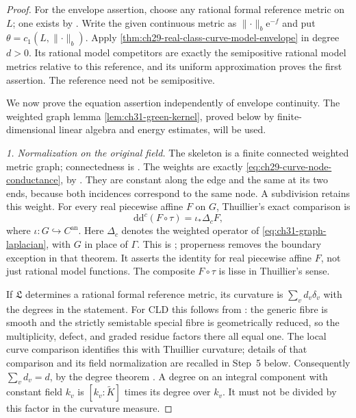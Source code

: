 \begin{proof}
For the envelope assertion, choose any rational formal reference
metric on \(L\); one exists by \cite[\S2.1 and Proposition~2.10]{GM19}.
Write the given continuous metric as
\(\lVert\cdot\rVert_b\mathrm e^{-f}\) and put
\(\theta=c_1(L,\lVert\cdot\rVert_b)\).
Apply \cref{thm:ch29-real-class-curve-model-envelope} in degree \(d>0\).
Its rational model competitors are exactly the semipositive rational
model metrics relative to this reference, and its uniform approximation
proves the first assertion.  The reference need not be semipositive.

We now prove the equation assertion independently of envelope continuity.
The weighted graph lemma \cref{lem:ch31-green-kernel}, proved below by
finite-dimensional linear algebra and energy estimates, will be used.

\emph{1. Normalization on the original field.}
The skeleton is a finite connected weighted metric graph; connectedness
is \cite[Remark~2.2.19(3)]{Thu05}.  The weights are exactly
\eqref{eq:ch29-curve-node-conductance}, by
\cite[\S2.2.3, p.~41]{Thu05}.  They are constant along the edge and
the same at its two ends, because both incidences correspond to the
same node.  A subdivision retains this weight.  For every real
piecewise affine \(F\) on \(G\), Thuillier's exact comparison is
\begin{equation}
\label{eq:ch29-curve-retraction-current}
  \mathrm d\mathrm d^c(F\circ\tau)=\iota_*\Delta_c F,
\end{equation}
where \(\iota:G\hookrightarrow C^{\mathrm{an}}\).
Here \(\Delta_c\) denotes the weighted operator of
\eqref{eq:ch31-graph-laplacian}, with \(G\) in place of \(\Gamma\).
This is \cite[Theorem~3.2.10(ii)]{Thu05}; properness removes the
boundary exception in that theorem.  It asserts the identity for real
piecewise affine \(F\), not just rational model functions.  The
composite \(F\circ\tau\) is lisse in Thuillier's sense.

If \(\mathfrak L\) determines a rational formal reference metric,
its curvature is \(\sum_v d_v\delta_v\) with the degrees in the
statement.  For CLD this follows from
\cite[Theorem~18.5.5 and Proposition~18.5.6(a)--(c)]{CLD25}:
the generic fibre is smooth and the strictly semistable special fibre
is geometrically reduced, so the multiplicity, defect, and graded
residue factors there all equal one.  The local curve comparison
identifies this with Thuillier curvature; details of that comparison
and its field normalization are recalled in Step~5 below.
Consequently \(\sum_vd_v=d\), by the degree theorem
\cite[Theorem~18.3.11]{CLD25}.  A degree on an integral component
with constant field \(k_v\) is
\([k_v:\widetilde K]\) times its degree over \(k_v\).
It must not be divided by this factor in the curvature measure.


\end{proof}
